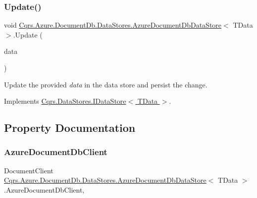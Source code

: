 \subsubsection{\texorpdfstring{Update()}{Update()}}
{\footnotesize\ttfamily void \hyperlink{classCqrs_1_1Azure_1_1DocumentDb_1_1DataStores_1_1AzureDocumentDbDataStore}{Cqrs.\+Azure.\+Document\+Db.\+Data\+Stores.\+Azure\+Document\+Db\+Data\+Store}$<$ T\+Data $>$.Update (\begin{DoxyParamCaption}\item[{T\+Data}]{data }\end{DoxyParamCaption})}



Update the provided {\itshape data}  in the data store and persist the change. 



Implements \hyperlink{interfaceCqrs_1_1DataStores_1_1IDataStore_a6d5d4dd572de8db01ff0c48d37faefa7_a6d5d4dd572de8db01ff0c48d37faefa7}{Cqrs.\+Data\+Stores.\+I\+Data\+Store$<$ T\+Data $>$}.



\subsection{Property Documentation}
\mbox{\label{classCqrs_1_1Azure_1_1DocumentDb_1_1DataStores_1_1AzureDocumentDbDataStore_a76ff9f2318e11c5c36063235a9bcdf10_a76ff9f2318e11c5c36063235a9bcdf10}} 
\subsubsection{\texorpdfstring{Azure\+Document\+Db\+Client}{AzureDocumentDbClient}}
{\footnotesize\ttfamily Document\+Client \hyperlink{classCqrs_1_1Azure_1_1DocumentDb_1_1DataStores_1_1AzureDocumentDbDataStore}{Cqrs.\+Azure.\+Document\+Db.\+Data\+Stores.\+Azure\+Document\+Db\+Data\+Store}$<$ T\+Data $>$.Azure\+Document\+Db\+Client\hspace{0.3cm}{\ttfamily [get]}, {\ttfamily [protected]}}



